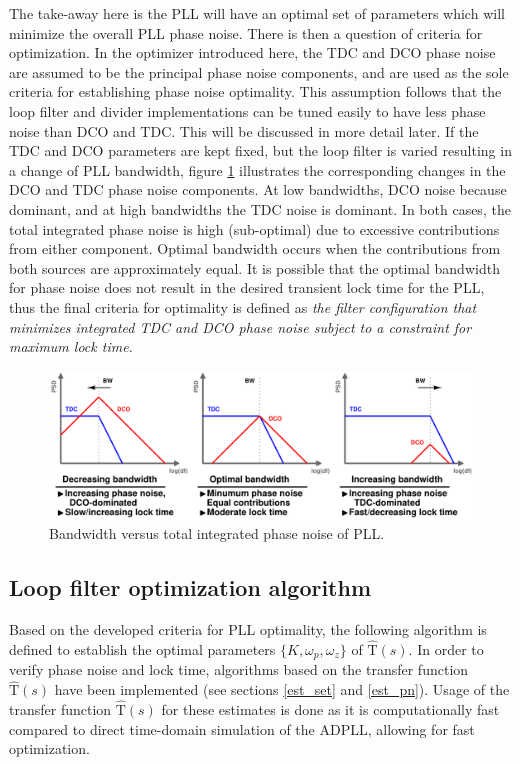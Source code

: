 The take-away here is the PLL will have an optimal set of parameters which will minimize the overall PLL phase noise. There is then a question of criteria for optimization. In the optimizer introduced here, the TDC and DCO phase noise are assumed to be the principal phase noise components, and are used as the sole criteria for establishing phase noise optimality. This assumption follows that the loop filter and divider implementations can be tuned easily to have less phase noise than DCO and TDC. This will be discussed in more detail later. If the TDC and DCO parameters are kept fixed, but the loop filter is varied resulting in a change of PLL bandwidth, figure \ref{fig:bw_vs_pn2} illustrates the corresponding changes in the DCO and TDC phase noise components. At low bandwidths, DCO noise because dominant, and at high bandwidths the TDC noise is dominant. In both cases, the total integrated phase noise is high (sub-optimal) due to excessive contributions from either component. Optimal bandwidth occurs when the contributions from both sources are approximately equal. It is possible that the optimal bandwidth for phase noise does not result in the desired transient lock time for the PLL, thus the final criteria for optimality is defined as \textit{the filter configuration that minimizes integrated TDC and DCO phase noise subject to a constraint for maximum lock time.}

\begin{figure}[htb!]
	\center\includegraphics[width=1\textwidth, angle=0]{figs/loop_bandwidth}
	\caption{Bandwidth versus total integrated phase noise of PLL.}
	\label{fig:bw_vs_pn2}
\end{figure}


\subsection{Loop filter optimization algorithm}
Based on the developed criteria for PLL optimality, the following algorithm is defined to establish the optimal parameters $\{K, \omega_p, \omega_z\}$ of $\mathrm{\hat{T}}(s)$. In order to verify phase noise and lock time, algorithms based on the transfer function $\mathrm{\hat{T}}(s)$ have been implemented (see sections \ref{est_set} and \ref{est_pn}). Usage of the transfer function $\mathrm{\hat{T}}(s)$ for these estimates is done as it is computationally fast compared to direct time-domain simulation of the ADPLL, allowing for fast optimization. 

